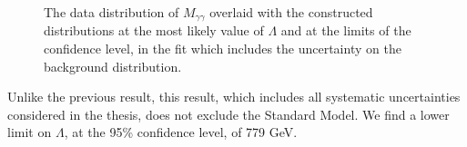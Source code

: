 \begin{figure}[htp]
\begin{minipage}[b]{.69\textwidth}\hfill
\begin{infilsf} \tiny

\end{infilsf}
\end{minipage}
\begin{minipage}[b]{.3\textwidth}
\caption{The data distribution of $M_{\gamma\gamma}$ overlaid with the constructed distributions at the most likely value of $\Lambda$ and at the limits of the confidence level, in the fit which includes the uncertainty on the background distribution.}\label{bckres}
\end{minipage}
\end{figure}

Unlike the previous result, this result, which includes all systematic uncertainties considered in the thesis, does not exclude the Standard Model. We find a lower limit on $\Lambda$, at the 95\% confidence level, of 779 GeV.